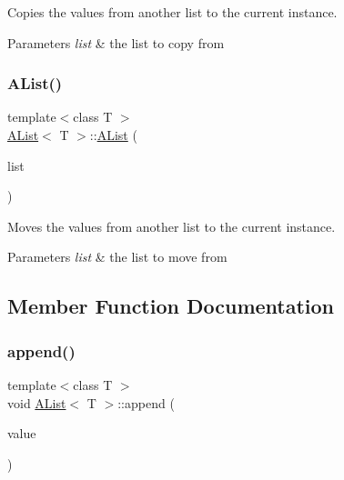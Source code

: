 Copies the values from another list to the current instance. 


\begin{DoxyParams}{Parameters}
{\em list} & the list to copy from \\
\hline
\end{DoxyParams}
\mbox{\label{class_a_list_a0e4ad9eb6d7cbb883a56f67589c65be9}} 
\subsubsection{\texorpdfstring{AList()}{AList()}\hspace{0.1cm}{\footnotesize\ttfamily [3/3]}}
{\footnotesize\ttfamily template$<$class T $>$ \\
\mbox{\hyperlink{class_a_list}{A\+List}}$<$ T $>$\+::\mbox{\hyperlink{class_a_list}{A\+List}} (\begin{DoxyParamCaption}\item[{\mbox{\hyperlink{class_a_list}{A\+List}}$<$ T $>$ \&\&}]{list }\end{DoxyParamCaption})}



Moves the values from another list to the current instance. 


\begin{DoxyParams}{Parameters}
{\em list} & the list to move from \\
\hline
\end{DoxyParams}


\subsection{Member Function Documentation}
\mbox{\label{class_a_list_a210e9e0657a0f4541247a290d21b6d23}} 
\subsubsection{\texorpdfstring{append()}{append()}\hspace{0.1cm}{\footnotesize\ttfamily [1/2]}}
{\footnotesize\ttfamily template$<$class T $>$ \\
void \mbox{\hyperlink{class_a_list}{A\+List}}$<$ T $>$\+::append (\begin{DoxyParamCaption}\item[{const T \&}]{value }\end{DoxyParamCaption})}



